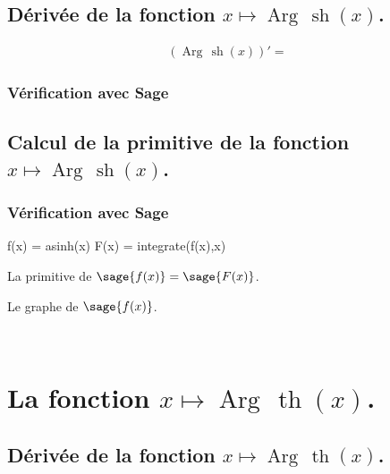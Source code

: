\documentclass[a4paper,14pt]{extreport} %
\renewcommand{\sinh}{\mathop{\mathrm{sh}}}
\renewcommand{\tanh}{\mathop{\mathrm{th}}}
\renewcommand{\arg}{\mathop{\mathrm{Arg\,}}}
\begin{document}
\subsection{Dérivée de la fonction $x \mapsto \arg \sinh(x)$.}

\begin{align*}
(\arg \sinh(x))' = &
\end{align*}


\subsubsection{Vérification avec Sage}



\subsection{Calcul de la primitive de la fonction  $x \mapsto \arg \sinh(x)$.}




\subsubsection{Vérification avec Sage}

\begin{sageblock}
    f(x) = asinh(x)
    F(x) = integrate(f(x),x)
\end{sageblock}


La primitive de $\sage{f(x)} = \sage{F(x)} $.



Le graphe de $\sage{f(x)} $.


\begin{center}
 \\
\end{center}








\section{La fonction  $x \mapsto \arg \tanh(x)$.}





\subsection{Dérivée de la fonction $x \mapsto \arg \tanh(x)$.}
\end{document}
